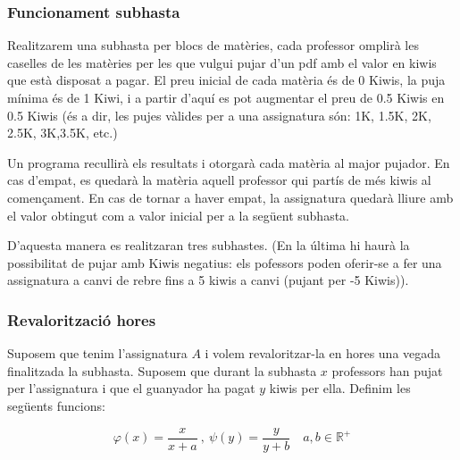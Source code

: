 \documentclass[10pt,twocolumn]{article}
\begin{document}
\subsubsection{Funcionament subhasta}
Realitzarem una subhasta per blocs de matèries, cada professor omplirà les caselles de les matèries per les que vulgui pujar d'un pdf amb el valor en kiwis que està disposat  a pagar. El preu inicial de cada matèria és de 0 Kiwis, la puja mínima és de 1 Kiwi, i a partir d'aquí es pot augmentar el preu de 0.5 Kiwis en 0.5 Kiwis (és a dir, les pujes vàlides per a una assignatura són: 1K, 1.5K, 2K, 2.5K, 3K,3.5K, etc.)

Un programa recullirà els resultats i otorgarà cada matèria al major pujador. En cas d'empat, es quedarà la matèria aquell professor qui partís de més kiwis al començament. En cas de tornar a haver empat, la assignatura quedarà lliure amb el valor obtingut com a valor inicial per a la següent subhasta.

D'aquesta manera es realitzaran tres subhastes. (En la última hi haurà la possibilitat de pujar amb Kiwis negatius: els pofessors poden oferir-se a fer una assignatura a canvi de rebre fins a 5 kiwis a canvi (pujant per -5 Kiwis)).

\subsubsection{Revalorització hores}

Suposem que tenim l'assignatura $A$ i volem revaloritzar-la en hores una vegada finalitzada la subhasta.
Suposem que durant la subhasta $x$ professors han pujat per l'assignatura i que el guanyador ha pagat $y$ kiwis per ella. Definim les següents funcions:

$$\varphi (x)=\frac{x}{x+a}\ ,\  \psi(y)=\frac{y}{y+b} \quad a,b\in\mathbb{R}^{+} $$
	
\end{document}
